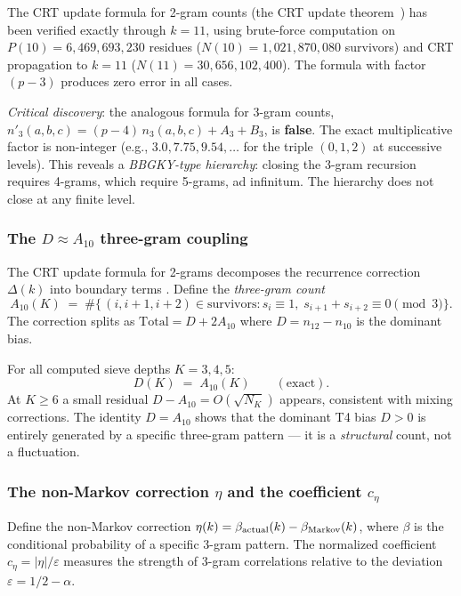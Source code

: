 \documentclass[12pt,a4paper]{article}
\begin{document}
The CRT update formula for 2-gram counts (the CRT update theorem~\cite{companion_M1})
has been verified exactly through $k = 11$, using brute-force
computation on $P(10) = 6{,}469{,}693{,}230$ residues
($N(10) = 1{,}021{,}870{,}080$ survivors) and CRT propagation to
$k = 11$ ($N(11) = 30{,}656{,}102{,}400$).
The formula with factor $(p-3)$ produces zero error in all cases.

\emph{Critical discovery}: the analogous formula for 3-gram counts,
$n'_3(a,b,c) = (p-4)\,n_3(a,b,c) + A_3 + B_3$, is
\textbf{false}. The exact multiplicative factor is non-integer
(e.g., $3.0, 7.75, 9.54, \ldots$ for the triple $(0,1,2)$ at
successive levels). This reveals a \emph{BBGKY-type hierarchy}:
closing the 3-gram recursion requires 4-grams, which require
5-grams, ad infinitum. The hierarchy does not close at any finite level.

\subsubsection{The $D \approx A_{10}$ three-gram coupling}
\label{sec:ch7b_DA10}

The CRT update formula for 2-grams decomposes the recurrence
correction $\Delta(k)$ into boundary terms .
Define the \emph{three-gram count}
\begin{equation}
  A_{10}(K) \;=\; \#\bigl\{\,(i,i{+}1,i{+}2) \in \text{survivors}
  : s_i \equiv 1,\; s_{i+1}+s_{i+2} \equiv 0 \pmod{3}\bigr\}.
  \label{eq:A10_def_ext}
\end{equation}
The correction splits as
$\mathrm{Total} = D + 2A_{10}$
where $D = n_{12}-n_{10}$ is the dominant bias.

\begin{proposition}[$D = A_{10}$ quasi-identity]
\label{prop:DA10_ext}
For all computed sieve depths $K = 3,4,5$:
\[
  D(K) \;=\; A_{10}(K) \qquad (\text{exact}).
\]
At $K \geq 6$ a small residual $D - A_{10} = O(\sqrt{N_K})$ appears,
consistent with mixing corrections.
The identity $D = A_{10}$ shows that the dominant T4 bias $D > 0$
is entirely generated by a specific three-gram pattern --- it is a
\emph{structural} count, not a fluctuation.
\end{proposition}

\subsubsection{The non-Markov correction $\eta$ and the coefficient $c_\eta$}

Define the non-Markov correction $\eta(k) = \beta_{\rm actual}(k) -
\beta_{\rm Markov}(k)$, where $\beta$ is the conditional probability
of a specific 3-gram pattern. The normalized coefficient
$c_\eta = |\eta|/\varepsilon$ measures the strength of 3-gram
correlations relative to the deviation $\varepsilon = 1/2 - \alpha$.
\end{document}
